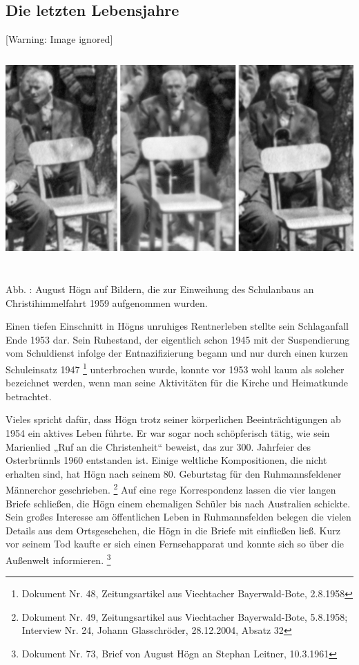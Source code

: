 \subsection{Die letzten Lebensjahre}

\hypertarget{RefHeadingToc100333738}{}  [Warning: Image ignored]
\includegraphics[width=15.981cm,height=8.56cm]{pictures/zulassungsarbeit-img053.jpg}


Abb. : August Högn auf Bildern, die zur
Einweihung des Schulanbaus an Christihimmelfahrt 1959 aufgenommen
wurden.

Einen tiefen Einschnitt in Högns unruhiges Rentnerleben stellte sein
Schlaganfall Ende 1953 dar. Sein Ruhestand, der eigentlich schon 1945
mit der Suspendierung vom Schuldienst infolge der Entnazifizierung
begann und nur durch einen kurzen Schuleinsatz 1947 \footnote{Dokument
Nr. 48, Zeitungsartikel aus Viechtacher Bayerwald-Bote, 2.8.1958}
unterbrochen wurde, konnte vor 1953 wohl kaum als solcher bezeichnet
werden, wenn man seine Aktivitäten für die Kirche und Heimatkunde
betrachtet.

Vieles spricht dafür, dass Högn trotz seiner körperlichen
Beeinträchtigungen ab 1954 ein aktives Leben führte. Er war sogar noch
schöpferisch tätig, wie sein Marienlied „Ruf an die Christenheit“
beweist, das zur 300. Jahrfeier des Osterbrünnls 1960 entstanden ist.
Einige weltliche Kompositionen, die nicht erhalten sind, hat Högn nach
seinem 80. Geburtstag für den Ruhmannsfeldener Männerchor
geschrieben. \footnote{Dokument Nr. 49, Zeitungsartikel aus Viechtacher
Bayerwald-Bote, 5.8.1958; Interview Nr. 24, Johann Glasschröder,
28.12.2004, Absatz 32} Auf eine rege Korrespondenz lassen die vier
langen Briefe schließen, die Högn einem ehemaligen Schüler bis nach
Australien schickte. Sein großes Interesse am öffentlichen Leben in
Ruhmannsfelden belegen die vielen Details aus dem Ortsgeschehen, die
Högn in die Briefe mit einfließen ließ. Kurz vor seinem Tod kaufte er
sich einen Fernsehapparat und konnte sich so über die Außenwelt
informieren. \footnote{Dokument Nr. 73, Brief von August Högn an
Stephan Leitner, 10.3.1961}

